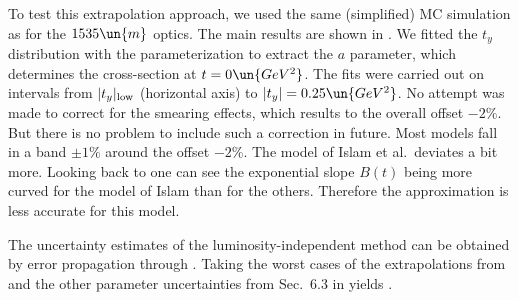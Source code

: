 To test this extrapolation approach, we used the same (simplified) MC simulation as for the $1535\un{m}$ optics. The main results are shown in . We fitted the $t_y$ distribution with the parameterization  to extract the $a$ parameter, which determines the cross-section at $t=0\un{GeV^2}$. The fits were carried out on intervals from $|t_y|_{\rm low}$ (horizontal axis) to $|t_y| = 0.25\un{GeV^2}$. No attempt was made to correct for the smearing effects, which results to the overall offset $-2\percent$. But there is no problem to include such a correction in future. Most models fall in a band $\pm 1\percent$ around the offset $-2\percent$. The model of Islam et al.~deviates a bit more. Looking back to  one can see the exponential slope $B(t)$ being more curved for the model of Islam than for the others. Therefore the approximation  is less accurate for this model.






The uncertainty estimates of the luminosity-independent method can be obtained by error propagation through . Taking the worst cases of the extrapolations from  and the other parameter uncertainties from Sec.~6.3 in  yields .


